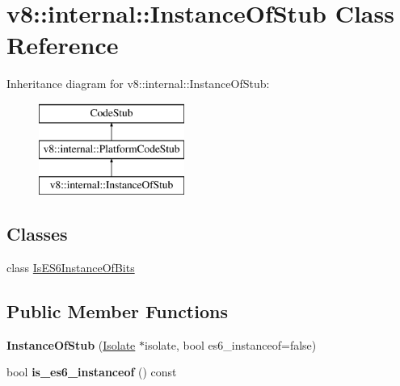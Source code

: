 \hypertarget{classv8_1_1internal_1_1_instance_of_stub}{}\section{v8\+:\+:internal\+:\+:Instance\+Of\+Stub Class Reference}
\label{classv8_1_1internal_1_1_instance_of_stub}
Inheritance diagram for v8\+:\+:internal\+:\+:Instance\+Of\+Stub\+:\begin{figure}[H]
\begin{center}
\leavevmode
\includegraphics[height=3.000000cm]{classv8_1_1internal_1_1_instance_of_stub}
\end{center}
\end{figure}
\subsection*{Classes}
\begin{DoxyCompactItemize}
\item 
class \hyperlink{classv8_1_1internal_1_1_instance_of_stub_1_1_is_e_s6_instance_of_bits}{Is\+E\+S6\+Instance\+Of\+Bits}
\end{DoxyCompactItemize}
\subsection*{Public Member Functions}
\begin{DoxyCompactItemize}
\item 
{\bfseries Instance\+Of\+Stub} (\hyperlink{classv8_1_1internal_1_1_isolate}{Isolate} $\ast$isolate, bool es6\+\_\+instanceof=false)\hypertarget{classv8_1_1internal_1_1_instance_of_stub_a27a0ebf0985ca98c74a4ac0c5e2bb3f6}{}\label{classv8_1_1internal_1_1_instance_of_stub_a27a0ebf0985ca98c74a4ac0c5e2bb3f6}

\item 
bool {\bfseries is\+\_\+es6\+\_\+instanceof} () const \hypertarget{classv8_1_1internal_1_1_instance_of_stub_a1c772fb74bf844a8ead4ca1a858891fd}{}\label{classv8_1_1internal_1_1_instance_of_stub_a1c772fb74bf844a8ead4ca1a858891fd}

\end{DoxyCompactItemize}
